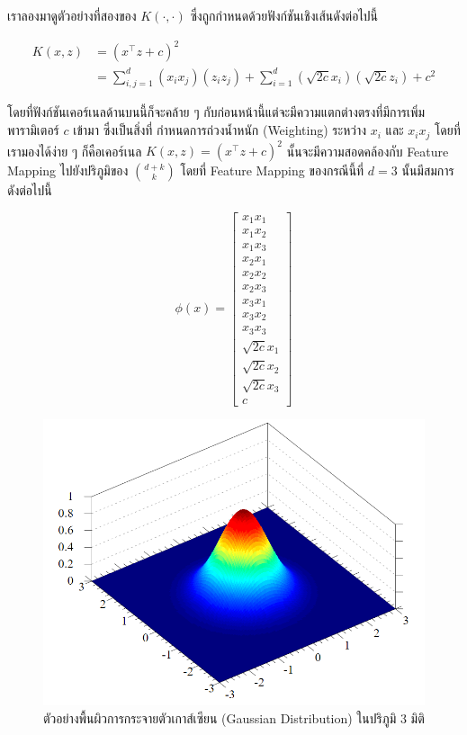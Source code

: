 เราลองมาดูตัวอย่างที่สองของ $K(\cdot,\cdot)$ ซึ่งถูกกำหนดด้วยฟังก์ชันเชิงเส้นดังต่อไปนี้

\begin{align}
    K(x,z) & = (x^{\top} z + c)^2                                                                                   \\
           & = \sum_{i,j=1}^d (x_i x_j)(z_i z_j) + \sum_{i=1}^d \left(\sqrt{2c}x_i\right) \left(\sqrt{2c}z_i\right)
    + c^2
\end{align}

\noindent โดยที่ฟังก์ชันเคอร์เนลด้านบนนี้ก็จะคล้าย ๆ กับก่อนหน้านี้แต่จะมีความแตกต่างตรงที่มีการเพิ่มพารามิเตอร์ $c$ เข้ามา ซึ่งเป็นสิ่งที่%
กำหนดการถ่วงน้ำหนัก (Weighting) ระหว่าง $x_{i}$ และ $x_{i}x_{j}$ โดยที่เรามองได้ง่าย ๆ ก็คือเคอร์เนล $K(x,z) = (x^{\top}
    z + c)^2$ นั้นจะมีความสอดคล้องกับ Feature Mapping ไปยังปริภูมิของ $\binom{d+k}{k}$ โดยที่ Feature Mapping ของกรณีนี้ที่
$d = 3$ นั้นมีสมการดังต่อไปนี้

\begin{equation}\label{eq:feature_map_ex2}
    \phi(x) =
    \begin{bmatrix}
        x_1 x_1      \\
        x_1 x_2      \\
        x_1 x_3      \\
        x_2 x_1      \\
        x_2 x_2      \\
        x_2 x_3      \\
        x_3 x_1      \\
        x_3 x_2      \\
        x_3 x_3      \\
        \sqrt{2c}x_1 \\
        \sqrt{2c}x_2 \\
        \sqrt{2c}x_3 \\
        c
    \end{bmatrix}
\end{equation}

\begin{figure}[H]
    \centering
    \includegraphics[width=0.9\linewidth]{fig/gaussian-3d.png}
    \caption{ตัวอย่างพื้นผิวการกระจายตัวเกาส์เซียน (Gaussian Distribution) ในปริภูมิ 3 มิติ}
    \label{fig:gaussian_3d}
\end{figure}

